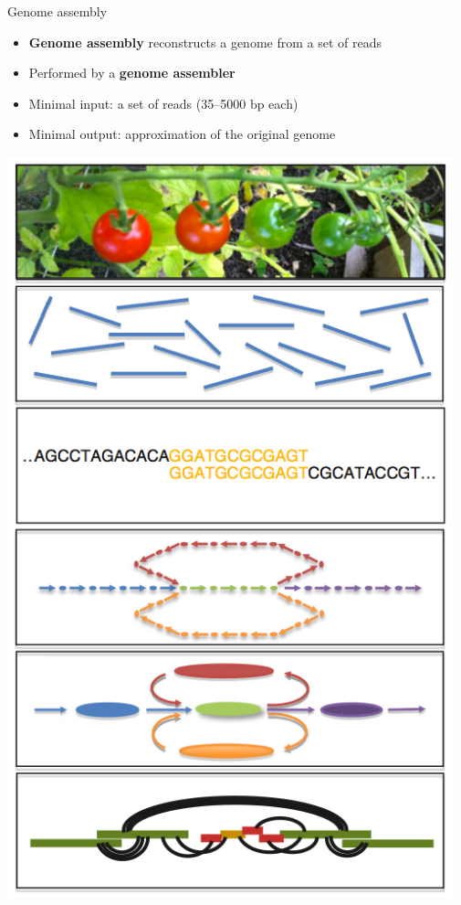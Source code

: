 \documentclass[xcolor=dvipsnames]{beamer}
\begin{document}
\begin{frame}{Genome assembly}
    \begin{minipage}{0.63\textwidth}
        \begin{itemize}
            \item {\bf Genome assembly} reconstructs
                  a genome from a set of reads
            \item Performed by a {\bf genome assembler}
            \item Minimal input: a set of reads (35--5000 bp each)
            \item Minimal output: approximation of the original genome
        \end{itemize}
    \end{minipage}
    \begin{minipage}{0.35\textwidth}
        \includegraphics[width=0.97\textwidth]{AssemblyFlow.jpg}
    \end{minipage}
\end{frame}
\end{document}

